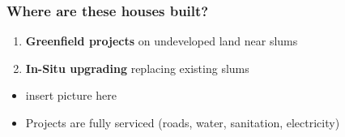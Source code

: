 \documentclass[aspectratio=149]{beamer}
\begin{document}
\begin{frame}
\frametitle{Where are these houses built?}

\begin{enumerate}
  \item \textbf{Greenfield projects} on undeveloped land near slums
  \item \textbf{In-Situ upgrading} replacing existing slums
\end{enumerate}

\begin{itemize}
  \item insert picture here
\end{itemize}

\begin{itemize}
  \item Projects are fully serviced (roads, water, sanitation, electricity)
\end{itemize}

\end{frame}

\end{document}
